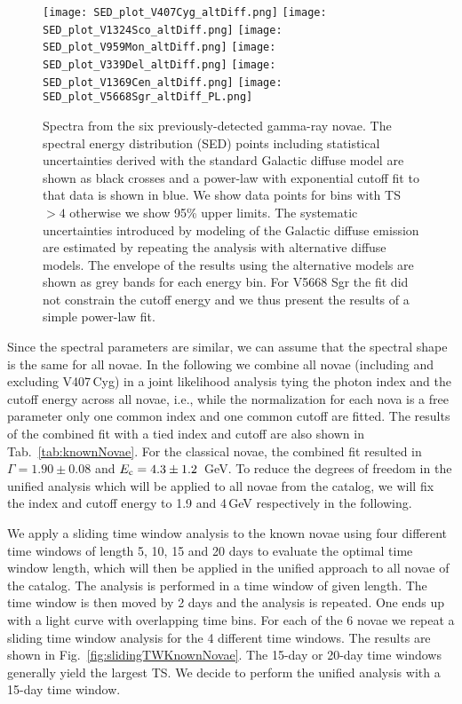 \documentclass{aa} %
\begin{document}
\begin{figure*}[htb!]
\begin{center}
\texttt{[image: SED\_plot\_V407Cyg\_altDiff.png]}
\texttt{[image: SED\_plot\_V1324Sco\_altDiff.png]}
\texttt{[image: SED\_plot\_V959Mon\_altDiff.png]}
\texttt{[image: SED\_plot\_V339Del\_altDiff.png]}
\texttt{[image: SED\_plot\_V1369Cen\_altDiff.png]}
\texttt{[image: SED\_plot\_V5668Sgr\_altDiff\_PL.png]}
\noindent
\caption{\small Spectra from the six previously-detected gamma-ray novae. The spectral energy distribution (SED) points including statistical uncertainties derived with the standard Galactic diffuse model are shown as black crosses and a power-law with exponential cutoff fit to that data is shown in blue. We show data points for bins with TS$>4$ otherwise we show 95\% upper limits. The systematic uncertainties introduced by modeling of the Galactic diffuse emission are estimated by repeating the analysis with alternative diffuse models. The envelope of the results using the alternative models are shown as grey bands for each energy bin. For V5668 Sgr the fit did not constrain the cutoff energy and we thus present the results of a simple power-law fit.}
\label{fig:spectraKnownNovae}
\end{center}
\end{figure*}

Since the spectral parameters are similar, we can assume that the spectral shape is the same for all novae. In the following we combine all novae (including and excluding V407\,Cyg) in a joint likelihood analysis tying the photon index and the cutoff energy across all novae, i.e., while the normalization for each nova is a free parameter only one common index and one common cutoff are fitted. The results of the combined fit with a tied index and cutoff are also shown in Tab.~\ref{tab:knownNovae}. 
For the classical novae, the combined fit resulted in $\Gamma = 1.90\pm0.08$ and $E_{\rm c} = 4.3\pm1.2$\, GeV. To reduce the degrees of freedom in the unified analysis which will be applied to all novae from the catalog, we will fix the index and cutoff energy to 1.9 and 4\,GeV respectively in the following.

We apply a sliding time window analysis to the known novae using four different time windows of length 5, 10, 15 and 20 days to evaluate the optimal time window length, which will then be applied in the unified approach to all novae of the catalog. The analysis is performed in a time window of given length. The time window is then moved by 2 days and the analysis is repeated. One ends up with a light curve with overlapping time bins. For each of the 6 novae we repeat a sliding time window analysis for the 4 different time windows. The results are shown in Fig.~\ref{fig:slidingTWKnownNovae}. The 15-day or 20-day time windows generally yield the largest TS. We decide to perform the unified analysis with a 15-day time window.
\end{document}
